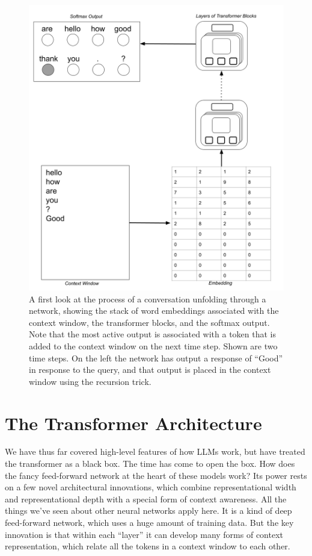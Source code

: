 \begin{figure}[ht]
\includegraphics[scale=.2]{./images/TransformerOverview2.png}
\caption[Jeff Yoshimi]{A first look at the process of a conversation unfolding
through a network, showing the stack of word embeddings associated with the
context window, the transformer blocks, and the softmax output. Note that the
most active output is associated with a token that is added to the context
window on the next time step. Shown are two time steps. On the left the network
has output a response of ``Good'' in response to the query, and that output is
placed in the context window using the recursion trick.
}
\label{transformerOverview}
\end{figure}

\section{The Transformer Architecture}\label{transformers}

 
We have thus far covered high-level features of how LLMs work, but have treated
the transformer as a black box. The time has come to open the box. How does the
fancy feed-forward network at the heart of these models work? Its power rests
on a few novel architectural innovations, which combine representational width
and representational depth with a special form of context awareness. All the
things we've seen about other neural networks apply here. It is a kind of deep
feed-forward network, which uses a huge amount of training data. But the key
innovation is that within each ``layer'' it can develop many forms of context
representation, which relate all the tokens in a context window to each other.


